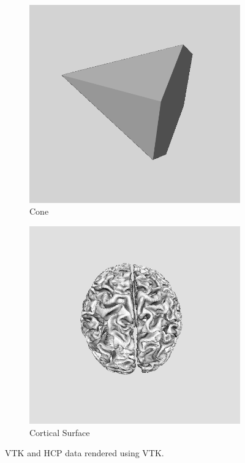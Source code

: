 \documentclass[MSc,paper=a4,pagesize=auto]{icldt}
\begin{document}
\begin{figure}[htbp!]
\centering
\begin{subfigure}{0.5\textwidth}
    \centering
    \includegraphics[width=0.8\linewidth]{resources/cone}
    \caption{Cone}
	\label{fig:sub1}
\end{subfigure}%
\centering
\begin{subfigure}{0.5\textwidth}
    \centering
    \includegraphics[width=0.8\linewidth]{resources/cortical_surface}
    \caption{Cortical Surface}
	\label{fig:sub2}
\end{subfigure}    
    \caption{VTK and HCP data rendered using VTK.}
    \label{fig:data_sources}
\end{figure}
\end{document}
